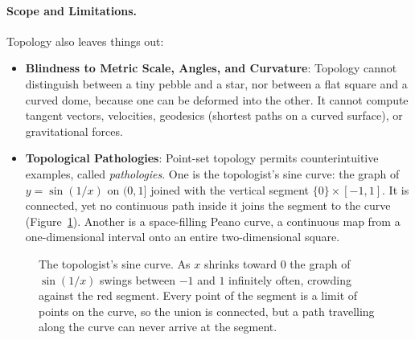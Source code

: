 \paragraph{Scope and Limitations.}
Topology also leaves things out:
\begin{itemize}
  \item \textbf{Blindness to Metric Scale, Angles, and Curvature}: Topology cannot distinguish between a tiny pebble and a star, nor between a flat square and a curved dome, because one can be deformed into the other. It cannot compute tangent vectors, velocities, geodesics (shortest paths on a curved surface), or gravitational forces.
  \item \textbf{Topological Pathologies}: Point-set topology permits counterintuitive examples, called \emph{pathologies}. One is the topologist's sine curve: the graph of $y = \sin(1/x)$ on $(0, 1]$ joined with the vertical segment $\{0\} \times [-1, 1]$. It is connected, yet no continuous path inside it joins the segment to the curve (Figure~\ref{37:fig-sine-curve}). Another is a space-filling Peano curve, a continuous map from a one-dimensional interval onto an entire two-dimensional square.
\end{itemize}

\begin{figure}[htbp]
\centering
{}
\caption{The topologist's sine curve. As $x$ shrinks toward $0$ the graph of $\sin(1/x)$ swings between $-1$ and $1$ infinitely often, crowding against the red segment. Every point of the segment is a limit of points on the curve, so the union is connected, but a path travelling along the curve can never arrive at the segment.}\label{37:fig-sine-curve}
\end{figure}

